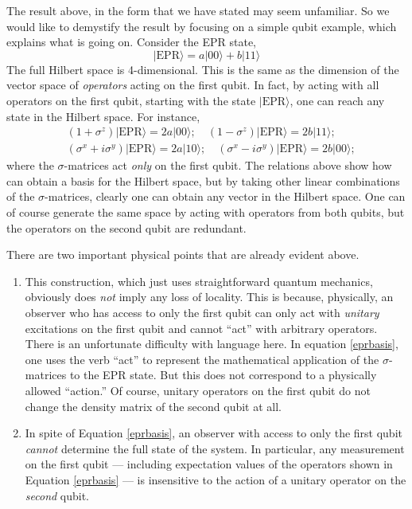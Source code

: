\documentclass[12pt]{article}
\newcommand{\be}{\begin{equation}}
\newcommand{\ee}{\end{equation}}
\begin{document}
The result above, in the form that we have stated may seem unfamiliar. So we would like to demystify the result by focusing on a simple qubit example, which explains what is going on.
Consider the EPR state, 
\be
|\text{EPR} \rangle = a |0 0 \rangle + b |1 1 \rangle
\ee
The full Hilbert space is 4-dimensional. This is the same as the dimension of the vector space of {\em operators} acting on the first qubit. In fact, by acting with all operators on the first qubit, starting with the state $|\text{EPR} \rangle$, one can reach any state in the Hilbert space. For instance, 
\be
\label{eprbasis}
\begin{split}
&(1 + \sigma^{z}) |\text{EPR} \rangle = 2 a |0 0 \rangle; \quad (1 - \sigma^{z}) |\text{EPR} \rangle = 2 b |1 1 \rangle; \\
&(\sigma^x + i \sigma^y) |\text{EPR} \rangle = 2 a |1 0 \rangle; \quad (\sigma^x - i \sigma^y)  |\text{EPR} \rangle = 2 b |0 0 \rangle; 
\end{split}
\ee
where the $\sigma$-matrices act {\em only} on the first qubit. The relations above show how can obtain a basis for the Hilbert space, but by taking other linear combinations of the $\sigma$-matrices, clearly one can obtain any vector in the Hilbert space. One can of course generate the same space by acting with operators from both qubits, but the operators on the second qubit are redundant.

There are two important physical points that are already evident above. 
\begin{enumerate}
\item
This construction, which just uses straightforward quantum mechanics, obviously does {\em not} imply any loss of locality. This is because, physically, an observer who has access to only the first qubit can only act with {\em unitary} excitations on the first qubit and cannot ``act'' with arbitrary operators. There is an unfortunate difficulty with language here. In equation \eqref{eprbasis}, one uses the verb ``act'' to represent the mathematical application of the $\sigma$-matrices to the EPR state. But this does not correspond to a physically allowed ``action.'' Of course, unitary operators 
on the first qubit do not change the density matrix of the second qubit at all. 
\item
In spite of Equation \eqref{eprbasis}, an observer with access to only the first qubit {\em cannot} determine the full state of the system. In particular, any measurement on the first qubit --- including expectation values of the operators shown in Equation \eqref{eprbasis} --- is insensitive to the action of a unitary operator on the {\em second} qubit. 
\end{enumerate}
\end{document}
